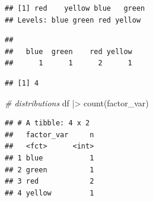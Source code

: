 \documentclass[
  12pt,
  oneside]{book}
\newenvironment{Shaded}{\begin{snugshade}}{\end{snugshade}}
\newcommand{\CommentTok}[1]{\textcolor[rgb]{0.56,0.35,0.01}{\textit{#1}}}
\newcommand{\FunctionTok}[1]{\textcolor[rgb]{0.00,0.00,0.00}{#1}}
\newcommand{\NormalTok}[1]{#1}
\newcommand{\SpecialCharTok}[1]{\textcolor[rgb]{0.00,0.00,0.00}{#1}}
\theoremstyle{definition}
\theoremstyle{definition}
\theoremstyle{definition}
\theoremstyle{definition}
\theoremstyle{remark}
\begin{document}
\begin{Shaded}
\end{Shaded}

\begin{verbatim}
## [1] red    yellow blue   green 
## Levels: blue green red yellow
\end{verbatim}

\begin{Shaded}
\end{Shaded}

\begin{verbatim}
## 
##   blue  green    red yellow 
##      1      1      2      1
\end{verbatim}

\begin{Shaded}
\end{Shaded}

\begin{verbatim}
## [1] 4
\end{verbatim}

\begin{Shaded}
\begin{Highlighting}[]
\CommentTok{\# distributions}
\NormalTok{df }\SpecialCharTok{|\textgreater{}} \FunctionTok{count}\NormalTok{(factor\_var)}
\end{Highlighting}
\end{Shaded}

\begin{verbatim}
## # A tibble: 4 x 2
##   factor_var     n
##   <fct>      <int>
## 1 blue           1
## 2 green          1
## 3 red            2
## 4 yellow         1
\end{verbatim}

\begin{Shaded}
\end{Shaded}
\end{document}
